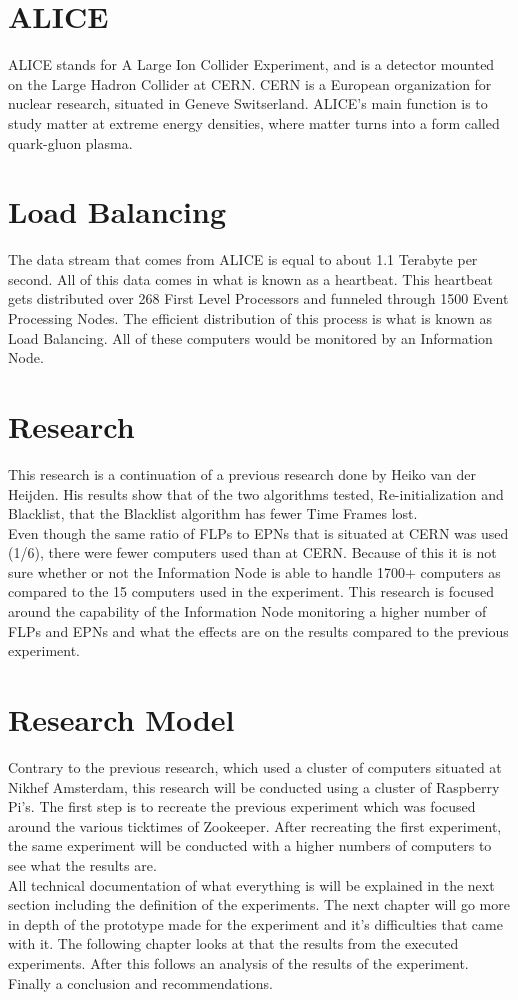 \documentclass{report}
\begin{document}
\section{ALICE}
ALICE stands for A Large Ion Collider Experiment, and is a detector mounted on the Large Hadron Collider at CERN. CERN is a European organization for  nuclear research, situated in Geneve Switserland. ALICE's main function is to study matter at extreme energy densities, where matter turns into a form called quark-gluon plasma.

\section{Load Balancing}
The data stream that comes from ALICE is equal to about 1.1 Terabyte per second. All of this data comes in what is known as a heartbeat. This heartbeat gets distributed over 268 First Level Processors and funneled through	1500 Event Processing Nodes. The efficient distribution of this process is what is known as Load Balancing. All of these computers would be monitored by an Information Node.

\section{Research}
This research is a continuation of a previous research done by Heiko van der Heijden. His results show that of the two algorithms tested, Re-initialization and Blacklist, that the Blacklist algorithm has fewer Time Frames lost.\\
Even though the same ratio of FLPs to EPNs that is situated at CERN was used (1/6), there were fewer computers used than at CERN. Because of this it is not sure whether or not the Information Node is able to handle 1700+ computers as compared to the 15 computers used in the experiment. This research is focused around the capability of the Information Node monitoring a higher number of FLPs and EPNs and what the effects are on the results compared to the previous experiment.

\section{Research Model}
Contrary to the previous research, which used a cluster of computers situated at Nikhef Amsterdam, this research will be conducted using a cluster of Raspberry Pi's. The first step is to recreate the previous experiment which was focused around the various ticktimes of Zookeeper. After recreating the first experiment, the same experiment will be conducted with a higher numbers of computers to see what the results are. \\
All technical documentation of what everything is will be explained in the next section including the definition of the experiments.
The next chapter will go more in depth of the prototype made for the experiment and it's difficulties that came with it. The following chapter looks at that the results from the  executed experiments. After this follows an analysis of the results of the experiment. Finally a conclusion and recommendations.
\end{document}
